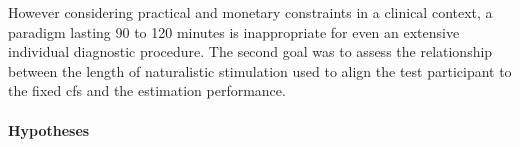 %
However considering practical and monetary constraints in a clinical context, a
paradigm lasting 90 to 120 minutes is inappropriate for even an extensive
individual diagnostic procedure.
The second goal was to assess the relationship between the length of
naturalistic stimulation used to align the test participant to the fixed
\ac{cfs} and the estimation performance.


\paragraph{Hypotheses}

